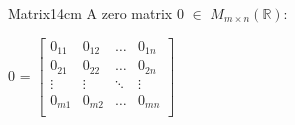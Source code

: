 \begin{definition}{Matrix}{14cm}
        A {\color{lblue} zero matrix} 0 $\in$ $M_{m \times n}(\mathbb{R})$:

        \hspace{0.5cm}
        0 = 
        $\begin{bmatrix}
            0_{11} & 0_{12} & \hdots & 0_{1n} \\

            0_{21} & 0_{22} & \hdots & 0_{2n} \\

            \vdots & \vdots & \ddots & \vdots \\
            
            0_{m1} & 0_{m2} & \hdots & 0_{mn} \\
        \end{bmatrix}$
    \end{definition}

    \newpage



